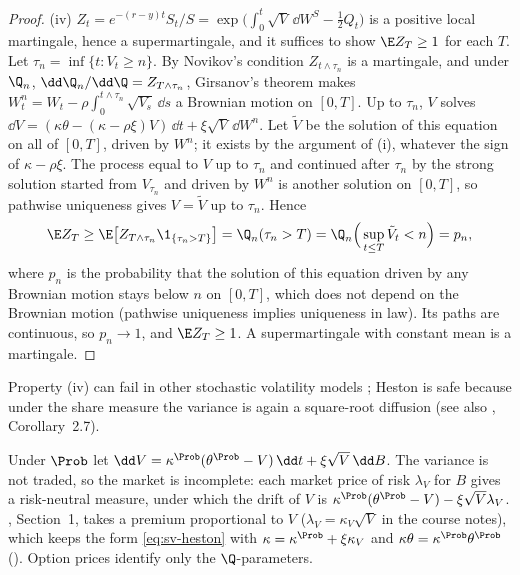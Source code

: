 \begin{proof}
(iv) $Z_t=e^{-(r-y)t}S_t/S=\exp\big(\int_0^t\sqrt V\,\dd W^S-\frac12Q_t\big)$ is a positive local martingale,
hence a supermartingale, and it suffices to show $\E Z_T\ge1$ for each $T$. Let $\tau_n=\inf\{t:V_t\ge n\}$.
By Novikov's condition $Z_{t\wedge\tau_n}$ is a martingale, and under $\Q_n$, $\dd\Q_n/\dd\Q=Z_{T\wedge\tau_n}$,
Girsanov's theorem makes $W^n_t=W_t-\rho\int_0^{t\wedge\tau_n}\sqrt{V_s}\,\dd s$ a Brownian motion on $[0,T]$. Up to
$\tau_n$, $V$ solves $\dd V=(\kappa\theta-(\kappa-\rho\xi)V)\,\dd t+\xi\sqrt V\,\dd W^n$. Let $\tilde V$ be the solution of
this equation on all of $[0,T]$, driven by $W^n$; it exists by the argument of (i), whatever the sign of
$\kappa-\rho\xi$. The process equal to $V$ up to $\tau_n$ and continued after $\tau_n$ by the strong solution started
from $V_{\tau_n}$ and driven by $W^n$ is another solution on $[0,T]$, so pathwise uniqueness gives $V=\tilde V$ up to
$\tau_n$. Hence
\[
  \E Z_T\ge\E\big[Z_{T\wedge\tau_n}\1_{\{\tau_n>T\}}\big]=\Q_n(\tau_n>T)=\Q_n\Big(\sup_{t\le T}\tilde V_t<n\Big)=p_n,
\]
where $p_n$ is the probability that the solution of this equation driven by any Brownian motion stays below
$n$ on $[0,T]$, which does not depend on the Brownian motion (pathwise uniqueness implies uniqueness in law).
Its paths are continuous, so $p_n\to1$, and $\E Z_T\ge1$. A supermartingale with constant mean is a martingale.
\end{proof}

Property (iv) can fail in other stochastic volatility models \citep{sin-1998}; Heston is safe because under the
share measure the variance is again a square-root diffusion (see also \citealp{keller-ressel-2011}, Corollary~2.7).

\begin{remark}\label{rem:sv-risk}
Under $\Prob$ let $\dd V=\kappa^{\Prob}(\theta^{\Prob}-V)\,\dd t+\xi\sqrt V\,\dd B$. The variance is not traded, so the
market is incomplete: each market price of risk $\lambda_V$ for $B$ gives a risk-neutral measure, under which
the drift of $V$ is $\kappa^{\Prob}(\theta^{\Prob}-V)-\xi\sqrt V\lambda_V$. \textcite{heston}, Section~1, takes a
premium proportional to $V$ ($\lambda_V=\kappa_V\sqrt V$ in the course notes), which keeps the form
\eqref{eq:sv-heston} with $\kappa=\kappa^{\Prob}+\xi\kappa_V$ and $\kappa\theta=\kappa^{\Prob}\theta^{\Prob}$
(). Option prices identify only the $\Q$-parameters.
\end{remark}

